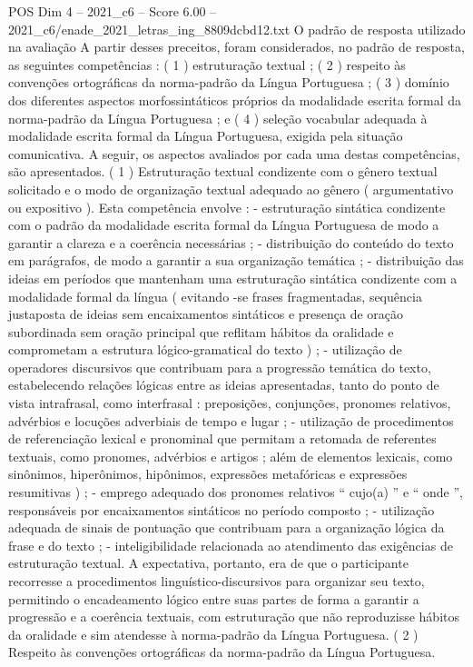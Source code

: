 \begin{textsample}{POS Dim 4 – 2021\_c6 – Score 6.00 – 2021\_c6/enade\_2021\_letras\_ing\_8809dcbd12.txt}
O padrão de resposta utilizado na avaliação A partir desses preceitos, foram considerados, no padrão de resposta, as seguintes competências : ( 1 ) estruturação textual ; ( 2 ) respeito às convenções ortográficas da norma-padrão da Língua Portuguesa ; ( 3 ) domínio dos diferentes aspectos morfossintáticos próprios da modalidade escrita formal da norma-padrão da Língua Portuguesa ; e ( 4 ) seleção vocabular adequada à modalidade escrita formal da Língua Portuguesa, exigida pela situação comunicativa.
A seguir, os aspectos avaliados por cada uma destas competências, são apresentados. ( 1 ) Estruturação textual condizente com o gênero textual solicitado e o modo de organização textual adequado ao gênero ( argumentativo ou expositivo ).
Esta competência envolve : - estruturação sintática condizente com o padrão da modalidade escrita formal da Língua Portuguesa de modo a garantir a clareza e a coerência necessárias ; - distribuição do conteúdo do texto em parágrafos, de modo a garantir a sua organização temática ; - distribuição das ideias em períodos que mantenham uma estruturação sintática condizente com a modalidade formal da língua ( evitando -se frases fragmentadas, sequência justaposta de ideias sem encaixamentos sintáticos e presença de oração subordinada sem oração principal que reflitam hábitos da oralidade e comprometam a estrutura lógico-gramatical do texto ) ; - utilização de operadores discursivos que contribuam para a progressão temática do texto, estabelecendo relações lógicas entre as ideias apresentadas, tanto do ponto de vista intrafrasal, como interfrasal : preposições, conjunções, pronomes relativos, advérbios e locuções adverbiais de tempo e lugar ; - utilização de procedimentos de referenciação lexical e pronominal que permitam a retomada de referentes textuais, como pronomes, advérbios e artigos ; além de elementos lexicais, como sinônimos, hiperônimos, hipônimos, expressões metafóricas e expressões resumitivas ) ; - emprego adequado dos pronomes relativos “ cujo(a) ” e “ onde ”, responsáveis por encaixamentos sintáticos no período composto ; - utilização adequada de sinais de pontuação que contribuam para a organização lógica da frase e do texto ; - inteligibilidade relacionada ao atendimento das exigências de estruturação textual.
A expectativa, portanto, era de que o participante recorresse a procedimentos linguístico-discursivos para organizar seu texto, permitindo o encadeamento lógico entre suas partes de forma a garantir a progressão e a coerência textuais, com estruturação que não reproduzisse hábitos da oralidade e sim atendesse à norma-padrão da Língua Portuguesa. ( 2 ) Respeito às convenções ortográficas da norma-padrão da Língua Portuguesa.

\end{textsample}
